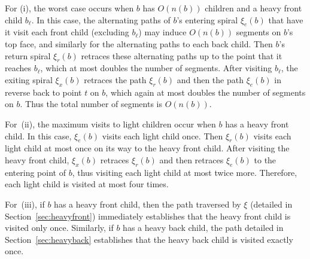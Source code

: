 \documentclass[11pt]{article}
\begin{document}
For (i), the worst case occurs when
$b$ has $O(n(b))$ children and a heavy front child $b_\ell$.
In this case, the
alternating paths of $b$'s entering spiral $\xi_e(b)$
that have it visit each front child (excluding $b_\ell$) may induce
$O(n(b))$  segments on $b$'s top face, and similarly for the alternating paths to each
back child.
Then $b$'s return spiral $\xi_r(b)$ retraces these alternating paths up to the point
that it reaches $b_\ell$, which
at most doubles the number of  segments.
After visiting  $b_\ell$,
the exiting spiral $\xi_x(b)$ retraces the path $\xi_r(b)$ and then the path
$\xi_e(b)$ in reverse back to point $t$ on $b$, which again
at most doubles the number of  segments
on $b$. Thus the total number of  segments is $O(n(b))$.

For~(ii), the maximum visits to light children occur when
$b$ has a heavy front child. In this case,
$\xi_e(b)$ visits each light child once.
Then $\xi_r(b)$
visits each light child at most once on its way to the heavy front child. After visiting the heavy
front child, $\xi_x(b)$ retraces
$\xi_r(b)$
and then retraces
$\xi_e(b)$ to the entering point of $b$, thus visiting each light child
at most twice more. Therefore,
each light child is visited at most four times.


For~(iii), if $b$ has a heavy front child, then the path traversed by $\xi$
(detailed in Section~\ref{sec:heavyfront}) immediately establishes that the heavy front
child is visited only once. Similarly, if $b$ has a heavy back child, the path detailed
in Section~\ref{sec:heavyback} establishes that the heavy back child is visited exactly once.
\end{document}
